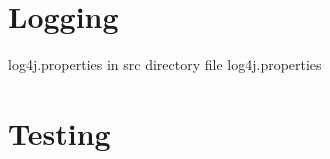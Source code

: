 \documentclass[a4paper,10pt]{article}
\title{}
\author{}
\begin{document}
\maketitle

\chapter{Logging}
log4j.properties in src directory file log4j.properties
\chapter{Testing}
\end{document}
